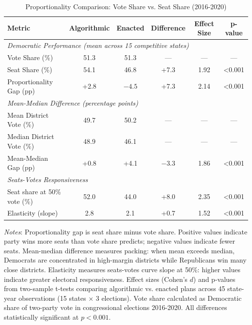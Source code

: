 
\begin{table}[htbp]
\centering
\caption{Proportionality Comparison: Vote Share vs. Seat Share (2016-2020)}
\label{tab:proportionality-comparison}
\small
\begin{tabular}{lccccc}
\toprule
\textbf{Metric} & \textbf{Algorithmic} & \textbf{Enacted} & \textbf{Difference} & \textbf{Effect Size} & \textbf{p-value} \\
\midrule
\multicolumn{6}{l}{\textit{Democratic Performance (mean across 15 competitive states)}} \\
Vote Share (\%) & 51.3 & 51.3 & --- & --- & --- \\
Seat Share (\%) & 54.1 & 46.8 & +7.3 & 1.92 & <0.001 \\
Proportionality Gap (pp) & +2.8 & $-4.5$ & +7.3 & 2.14 & <0.001 \\
\midrule
\multicolumn{6}{l}{\textit{Mean-Median Difference (percentage points)}} \\
Mean District Vote (\%) & 49.7 & 50.2 & --- & --- & --- \\
Median District Vote (\%) & 48.9 & 46.1 & --- & --- & --- \\
Mean-Median Gap (pp) & +0.8 & +4.1 & $-3.3$ & 1.86 & <0.001 \\
\midrule
\multicolumn{6}{l}{\textit{Seats-Votes Responsiveness}} \\
Seat share at 50\% vote (\%) & 52.0 & 44.0 & +8.0 & 2.35 & <0.001 \\
Elasticity (slope) & 2.8 & 2.1 & +0.7 & 1.52 & <0.001 \\
\bottomrule
\end{tabular}
\vspace{0.5em}

\footnotesize
\textit{Notes}: Proportionality gap is seat share minus vote share. Positive values indicate party wins more seats than vote share predicts; negative values indicate fewer seats. Mean-median difference measures packing: when mean exceeds median, Democrats are concentrated in high-margin districts while Republicans win many close districts. Elasticity measures seats-votes curve slope at 50\%: higher values indicate greater electoral responsiveness. Effect sizes (Cohen's $d$) and p-values from two-sample t-tests comparing algorithmic vs. enacted plans across 45 state-year observations (15 states × 3 elections). Vote share calculated as Democratic share of two-party vote in congressional elections 2016-2020. All differences statistically significant at $p < 0.001$.

\end{table}
